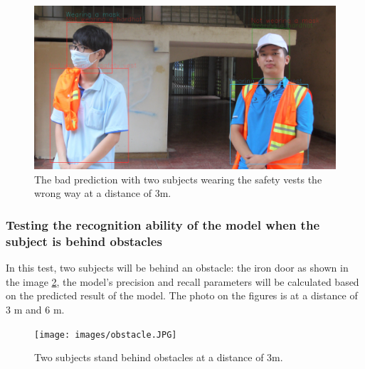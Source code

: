 \documentclass[conference]{IEEEtran}
\begin{document}
\begin{figure}[ht]
	\centerline{\includegraphics[scale=0.095]{images/bad_sv_predict_4.jpg}}
  	\caption{The bad prediction with two subjects wearing the safety vests the wrong way at a distance of 3m.}
  	\label{fig:bad_sv_pred_3}
\end{figure}

\subsubsection{Testing the recognition ability of the model when the subject is behind obstacles}
In this test, two subjects will be behind an obstacle: the iron door as shown in the image \ref{fig:obstacle}, the model's precision and recall parameters will be calculated based on the predicted result of the model. The photo on the figures is at a distance of $ 3 $ m and $ 6 $ m.
\begin{figure}[ht]
	\centerline{\texttt{[image: images/obstacle.JPG]}}
  	\caption{Two subjects stand behind obstacles at a distance of 3m.}
  	\label{fig:obstacle}
\end{figure}
\end{document}
